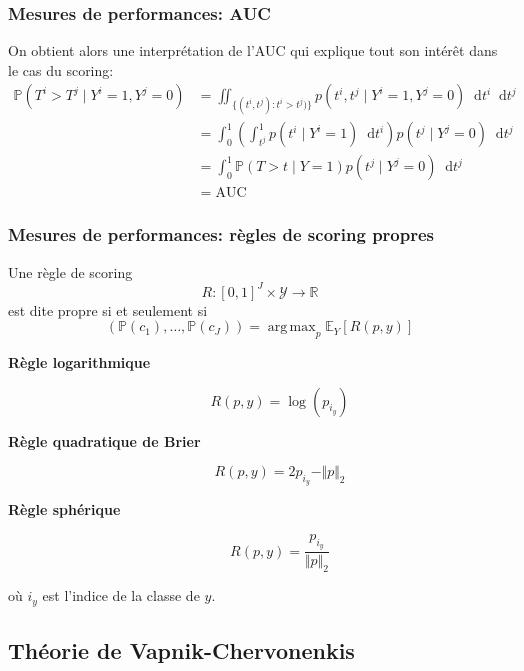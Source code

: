 \documentclass[dvipsnames,10pt]{beamer}
\DeclareMathOperator*{\argmax}{arg\,max}
\newcommand*\diff{\mathop{}\!\mathrm{d}}
\theoremstyle{plain}
\theoremstyle{definition}
\begin{document}
\begin{frame}
\frametitle{Mesures de performances: AUC}
On obtient alors une interprétation de l'AUC qui explique tout son intérêt dans le cas du scoring:
\begin{align*}
    \mathbb{P} ( T^i > T^j \mid Y^i = 1 , Y^j = 0 ) &= \iint_{ \{ (t^i,t^j) : t^i > t^j) \} } p(t^i,t^j \mid Y^i = 1 , Y^j = 0 ) \diff t^i \diff t^j \\
    &= \int_0^1 \left( \int_{t^j}^1 p(t^i \mid Y^i = 1 ) \diff t^i  \right) p(t^j \mid Y^j = 0 ) \diff t^j \\
    &= \int_0^1 \mathbb{P} ( T > t \mid Y = 1 ) p(t^j \mid Y^j = 0 ) \diff t^j \\
    &= \mathrm{AUC}
\end{align*}
\end{frame}

\begin{frame}
\frametitle{Mesures de performances: règles de scoring propres}
\begin{definition}
    Une règle de scoring
    \begin{equation*}
        R : [0,1]^J \times \mathcal{Y} \rightarrow \mathbb{R}
    \end{equation*}
    est dite propre si et seulement si
    \begin{equation*}
        \left( \mathbb{P}(c_1),\dotsc,\mathbb{P}(c_J)\right) = \argmax_p \mathbb{E}_Y \left[ R(p,y) \right]
    \end{equation*}
\end{definition}
\begin{description}
    \item[\textbf{Règle logarithmique}] \begin{equation*}
        R(p,y) = \log ( p_{i_y} )
    \end{equation*}
    \item[\textbf{Règle quadratique de Brier}] \begin{equation*}
        R(p,y) = 2 p_{i_y} - \Vert p \Vert_2
    \end{equation*}
    \item[\textbf{Règle sphérique}] \begin{equation*}
        R(p,y) = \frac{p_{i_y}}{\Vert p \Vert_2}
    \end{equation*}
\end{description}
où $i_y$ est l'indice de la classe de $y$.
\end{frame}

\subsection{Théorie de Vapnik-Chervonenkis}
\end{document}
